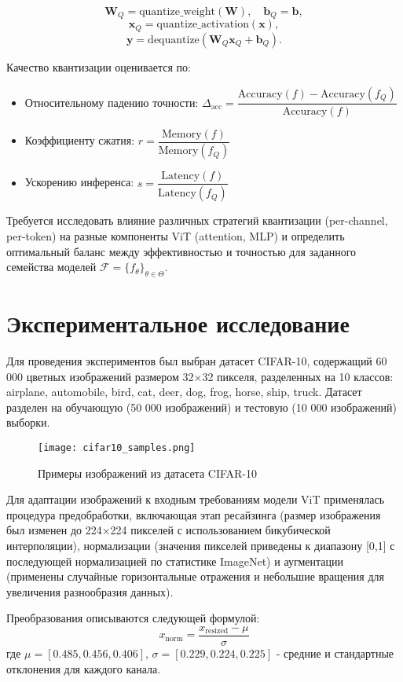 \documentclass{article}
\begin{document}
\[
\mathbf{W}_Q = \text{quantize\_weight}(\mathbf{W}), \quad \mathbf{b}_Q = \mathbf{b},
\]
\[
\mathbf{x}_Q = \text{quantize\_activation}(\mathbf{x}),
\]
\[
\mathbf{y} = \text{dequantize}(\mathbf{W}_Q \mathbf{x}_Q + \mathbf{b}_Q).
\]

Качество квантизации оценивается по:
\begin{itemize}
    \item Относительному падению точности: $\Delta_{\text{acc}} = \dfrac{\text{Accuracy}(f) - \text{Accuracy}(f_Q)}{\text{Accuracy}(f)}$
    \item Коэффициенту сжатия: $r = \dfrac{\text{Memory}(f)}{\text{Memory}(f_Q)}$
    \item Ускорению инференса: $s = \dfrac{\text{Latency}(f)}{\text{Latency}(f_Q)}$
\end{itemize}

Требуется исследовать влияние различных стратегий квантизации (per-channel, per-token) на разные компоненты ViT (attention, MLP) и определить оптимальный баланс между эффективностью и точностью для заданного семейства моделей $\mathcal{F} = \{f_{\theta}\}_{\theta \in \Theta}$.


\section{Экспериментальное исследование}

Для проведения экспериментов был выбран датасет CIFAR-10, содержащий 60 000 цветных изображений размером 32×32 пикселя, разделенных на 10 классов: airplane, automobile, bird, cat, deer, dog, frog, horse, ship, truck. Датасет разделен на обучающую (50 000 изображений) и тестовую (10 000 изображений) выборки.

\begin{figure}[h]
\centering
\texttt{[image: cifar10\_samples.png]}
\caption{Примеры изображений из датасета CIFAR-10}
\label{fig:cifar10_samples}
\end{figure}

Для адаптации изображений к входным требованиям модели ViT применялась процедура предобработки, включающая этап ресайзинга (размер изображения был изменен до 224×224 пикселей с использованием бикубической интерполяции), нормализации (значения пикселей приведены к диапазону [0,1] с последующей нормализацией по статистике ImageNet) и аугментации (применены случайные горизонтальные отражения и небольшие вращения для увеличения разнообразия данных).

Преобразования описываются следующей формулой:
\[
x_{\text{norm}} = \frac{x_{\text{resized}} - \mu}{\sigma}
\]
где $\mu = [0.485, 0.456, 0.406]$, $\sigma = [0.229, 0.224, 0.225]$ - средние и стандартные отклонения для каждого канала.
\end{document}
